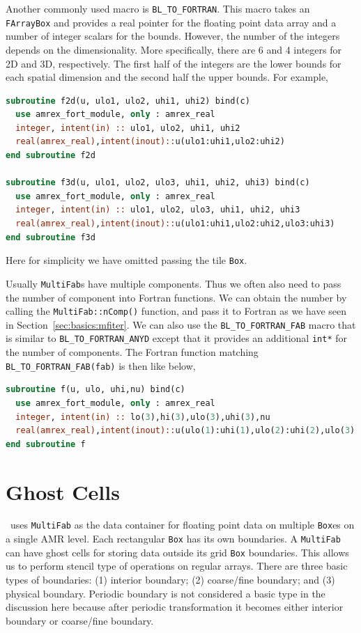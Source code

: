 {{Another commonly used macro is {\tt BL\_TO\_FORTRAN}.  This macro
takes an {\tt FArrayBox} and provides a real pointer for the floating
point data array and a number of integer scalars for the bounds.
However, the number of the integers depends on the dimensionality.
More specifically, there are 6 and 4 integers for 2D and 3D,
respectively.  The first half of the integers are the lower bounds for
each spatial dimension and the second half the upper bounds.  For
example,
\begin{lstlisting}[language=fortran]
subroutine f2d(u, ulo1, ulo2, uhi1, uhi2) bind(c)
  use amrex_fort_module, only : amrex_real
  integer, intent(in) :: ulo1, ulo2, uhi1, uhi2
  real(amrex_real),intent(inout)::u(ulo1:uhi1,ulo2:uhi2)
end subroutine f2d

subroutine f3d(u, ulo1, ulo2, ulo3, uhi1, uhi2, uhi3) bind(c)
  use amrex_fort_module, only : amrex_real
  integer, intent(in) :: ulo1, ulo2, ulo3, uhi1, uhi2, uhi3
  real(amrex_real),intent(inout)::u(ulo1:uhi1,ulo2:uhi2,ulo3:uhi3)
end subroutine f3d
\end{lstlisting}
Here for simplicity we have omitted passing the tile {\tt Box}.

Usually {\tt MultiFab}s have multiple components.  Thus we often also
need to pass the number of component into Fortran functions.  We can
obtain the number by calling the {\tt MultiFab::nComp()} function, and
pass it to Fortran as we have seen in Section~\ref{sec:basics:mfiter}.
We can also use the {\tt BL\_TO\_FORTRAN\_FAB} macro that is similar
to {\tt BL\_TO\_FORTRAN\_ANYD} except that it provides an additional
{\tt int*} for the number of components.  The Fortran function
matching {\tt BL\_TO\_FORTRAN\_FAB(fab)} is then like below,
\begin{lstlisting}[language=fortran]
subroutine f(u, ulo, uhi,nu) bind(c)
  use amrex_fort_module, only : amrex_real
  integer, intent(in) :: lo(3),hi(3),ulo(3),uhi(3),nu
  real(amrex_real),intent(inout)::u(ulo(1):uhi(1),ulo(2):uhi(2),ulo(3):uhi(3),nu)
end subroutine f
\end{lstlisting}

\section{Ghost Cells}

\amrex\ uses {\tt MultiFab} as the data container for floating point
data on multiple {\tt Box}es on a single AMR level.  Each rectangular
{\tt Box} has its own boundaries.  A {\tt MultiFab} can have ghost cells for
storing data outside its grid {\tt Box} boundaries.  This allows us to
perform stencil type of operations on regular arrays.  There are three
basic types of boundaries: (1) interior boundary; (2) coarse/fine
boundary; and (3) physical boundary.  Periodic boundary is not
considered a basic type in the discussion here because after periodic
transformation it becomes either interior boundary or coarse/fine
boundary. 

}}
